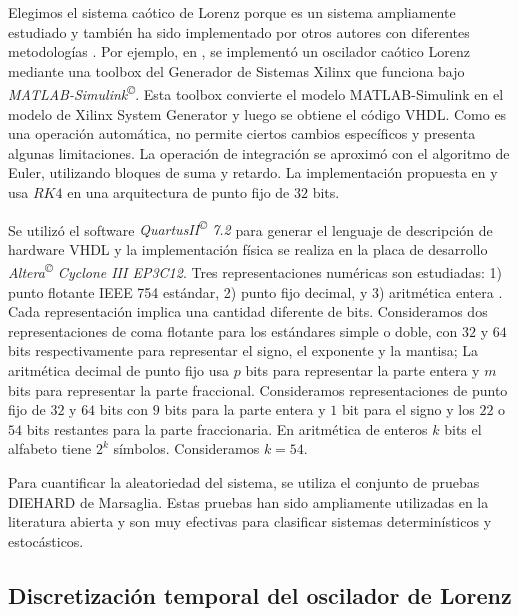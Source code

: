 Elegimos el sistema caótico de Lorenz porque es un sistema ampliamente estudiado y también ha sido implementado por otros autores con diferentes metodologías \cite{Asseri2002, Azzaz2009, Azzaz2010}.
Por ejemplo, en \cite{Asseri2002}, se implementó un oscilador caótico Lorenz mediante una toolbox del Generador de Sistemas Xilinx que funciona bajo \textit{MATLAB-Simulink\textsuperscript{\copyright}}.
Esta toolbox convierte el modelo MATLAB-Simulink en el modelo de Xilinx System Generator y luego se obtiene el código VHDL.
Como es una operación automática, no permite ciertos cambios específicos y presenta algunas limitaciones.
La operación de integración se aproximó con el algoritmo de Euler, utilizando bloques de suma y retardo.
La implementación propuesta en \cite{Azzaz2009} y \cite{Azzaz2010} usa $RK4$ en una arquitectura de punto fijo de $32$ bits.

Se utilizó el software \textit{QuartusII\textsuperscript{\copyright} 7.2} para generar el lenguaje de descripción de hardware VHDL y la implementación física se realiza en la placa de desarrollo \textit{Altera\textsuperscript{\copyright} Cyclone III EP3C12}.
Tres representaciones numéricas son estudiadas:
1) punto flotante IEEE 754 estándar,
2) punto fijo decimal, y
3) aritmética entera \cite{Gonzalez2003}.
Cada representación implica una cantidad diferente de bits.
Consideramos dos representaciones de coma flotante para los estándares simple o doble, con $32$ y $64$ bits respectivamente para representar el signo, el exponente y la mantisa;
La aritmética decimal de punto fijo usa $p$ bits para representar la parte entera y $m$ bits para representar la parte fraccional.
Consideramos representaciones de punto fijo de $32$ y $64$ bits con $9$ bits para la parte entera y $1$ bit para el signo y los $22$ o $54$ bits restantes para la parte fraccionaria.
En aritmética de enteros $k$ bits el alfabeto tiene $2^k$ símbolos.
Consideramos $k=54$.

Para cuantificar la aleatoriedad del sistema, se utiliza el conjunto de pruebas DIEHARD de Marsaglia.
Estas pruebas han sido ampliamente utilizadas en la literatura abierta y son muy efectivas para clasificar sistemas determinísticos y estocásticos.

\subsection{Discretización temporal del oscilador de Lorenz}
\label{sec:lorenzdigit}

